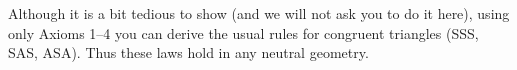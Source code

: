 \documentclass[noauthor,nooutcomes,12pt,hints]{ximera}
\begin{document}




Although it is a bit tedious to show (and we will not ask you to do it
here), using only Axioms 1--4 you can derive the usual rules for congruent
triangles (SSS, SAS, ASA). Thus these laws hold in any neutral
geometry.
\end{document}
